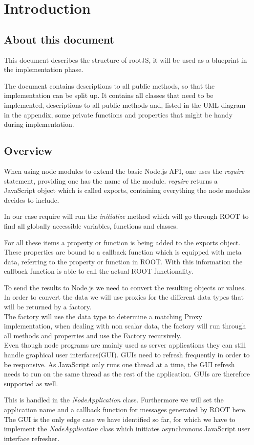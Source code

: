 \chapter{Introduction}
\section{About this document}
This document describes the structure of rootJS, it will be used as a blueprint in the implementation phase.

The document contains descriptions to all public methods, so that the implementation can be split up. It contains all classes that need to be implemented, descriptions to all public methods and, listed in the UML diagram in the appendix, some private functions and properties that might be handy during implementation.

\section{Overview}
When using node modules to extend the basic Node.js API, one uses the \textit{require} statement, providing one has the name of the module.
\textit{require} returns a JavaScript object which is called exports, containing everything the node modules decides to include.

In our case require will run the \textit{initialize} method which will go through ROOT to find all globally accessible variables, functions and classes.

For all these items a property or function is being added to the exports object.
These properties are bound to a callback function which is equipped with meta data, referring to the property or function in ROOT.
With this information the callback function is able to call the actual ROOT functionality.

To send the results to Node.js we need to convert the resulting objects or values.
In order to convert the data we will use proxies for the different data types that will be returned by a factory.\\

The factory will use the data type to determine a matching Proxy implementation, when dealing with non scalar data, the factory will run through all methods and properties and use the Factory recursively.\\

Even though node programs are mainly used as server applications they can still handle graphical user interfaces(GUI).
GUIs need to refresh frequently in order to be responsive. As JavaScript only runs one thread at a time, the GUI refresh needs to run on the same thread as the rest of the application. GUIs are therefore supported as well. 

This is handled in the \textit{NodeApplication} class. Furthermore we will set the application name and a callback function for messages generated by ROOT here. The GUI is the only edge case we have identified so far, for which we have to implement the \textit{NodeApplication} class which initiates asynchronous JavaScript user interface refresher. 
